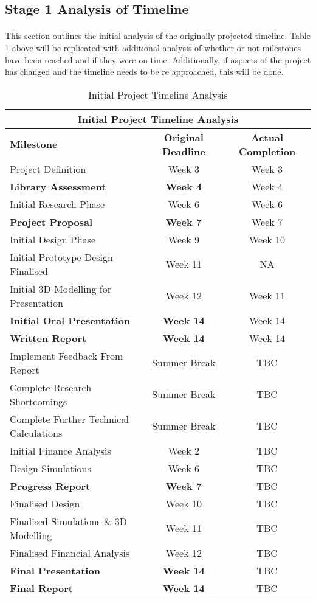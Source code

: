 \subsection{Stage 1 Analysis of Timeline}

\paragraph{}
This section outlines the initial analysis of the originally projected timeline. Table \ref{table:milestones_2} above will be replicated with additional analysis of whether or not milestones have been reached and if they were on time. Additionally, if aspects of the project has changed and the timeline needs to be re approached, this will be done.  

\begin{table}[H]
\centering
\begin{tabular}{||p{5cm} c c||} 
 \hline
 \multicolumn{3}{|c|}{\textbf{Initial Project Timeline Analysis}} \\ \hline\hline
 \textbf{Milestone} & \textbf{Original Deadline} & \textbf{Actual Completion} \\ [0.5ex] 
 \hline\hline
 Project Definition & Week 3 & Week 3\\ 
 \textbf{Library Assessment} & \textbf{Week 4} & Week 4\\
 Initial Research Phase & Week 6 & Week 6\\
 \textbf{Project Proposal} & \textbf{Week 7} & Week 7\\
 Initial Design Phase & Week 9 & Week 10\\
 Initial Prototype Design Finalised & Week 11 & NA\\
 Initial 3D Modelling for Presentation & Week 12 & Week 11\\ 
 \textbf{Initial Oral Presentation} & \textbf{Week 14} & Week 14\\
 \textbf{Written Report} & \textbf{Week 14} & Week 14\\ 
 Implement Feedback From Report & Summer Break & TBC \\
 Complete Research Shortcomings & Summer Break & TBC \\
 Complete Further Technical Calculations & Summer Break & TBC \\
 Initial Finance Analysis & Week 2 & TBC \\
 Design Simulations & Week 6 & TBC \\ 
 \textbf{Progress Report} & \textbf{Week 7} & TBC \\
 Finalised Design & Week 10 & TBC \\
 Finalised Simulations \& 3D Modelling & Week 11 & TBC \\
 Finalised Financial Analysis & Week 12 & TBC \\ 
 \textbf{Final Presentation} & \textbf{Week 14} & TBC\\
 \textbf{Final Report} & \textbf{Week 14} & TBC\\ [1ex] 
 \hline
\end{tabular}
\caption{Initial Project Timeline Analysis}
\label{table:milestones_2}
\end{table}      

